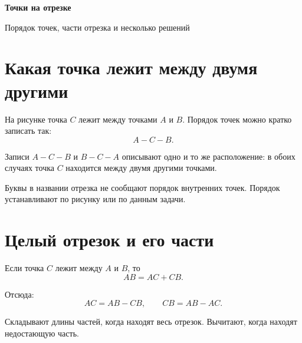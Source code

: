 
\begin{center}
  {\fontsize{25}{30}\selectfont\bfseries\sffamily\color{Primary}
    Точки на отрезке}

  \vspace{0.3em}

  {\large\sffamily\color{GrayText}
    Порядок точек, части отрезка и несколько решений}
\end{center}

\vspace{0.45em}

\section{Какая точка лежит между двумя другими}

\betweenfigure

\begin{propertybox}
  На рисунке точка \(C\) лежит между точками \(A\) и \(B\). Порядок точек
  можно кратко записать так:
  \[
    A-C-B.
  \]
\end{propertybox}

Записи \(A-C-B\) и \(B-C-A\) описывают одно и то же расположение: в обоих
случаях точка \(C\) находится между двумя другими точками.

\begin{warningbox}
  Буквы в названии отрезка не сообщают порядок внутренних точек. Порядок
  устанавливают по рисунку или по данным задачи.
\end{warningbox}

\section{Целый отрезок и его части}

\wholepartsfigure

\begin{propertybox}
  Если точка \(C\) лежит между \(A\) и \(B\), то
  \[
    AB=AC+CB.
  \]
\end{propertybox}

Отсюда:
\[
  AC=AB-CB,\qquad CB=AB-AC.
\]

\begin{notebox}
  Складывают длины частей, когда находят весь отрезок. Вычитают, когда
  находят недостающую часть.
\end{notebox}

